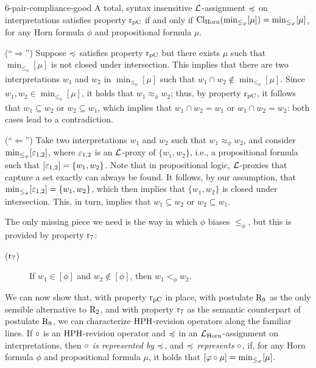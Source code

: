 \begin{prp}{}{6-pair-compliance-good}
	A total, syntax insensitive $\mathcal{L}$-assignment $\preccurlyeq$ on interpretations
	satisfies property $\mathrm{r}_{\mathrm{pC}}$
	if and only if
	${\operatorname{Cl}}_{\mathrm{Horn}}({\operatorname{min}}_{\le_{\varphi}}[\mu]) = {\operatorname{min}}_{\le_{\varphi}}[\mu]$,
	for any Horn formula $\phi$ and propositional formula $\mu$.
\end{prp}
\begin{prf*}{}{}%
	(``$\Rightarrow$'')
	Suppose
	$\preccurlyeq$ satisfies property $\mathrm{r}_{\mathrm{pC}}$
	but there exists $\mu$ such that 
	$\min_{\le_{\phi}}[\mu]$ is not closed under intersection.
	This implies that there are two interpretations $w_1$ and $w_2$ 
	in $\min_{\le_{\phi}}[\mu]$ such that $w_1\cap w_2\notin\min_{\le_{\phi}}[\mu]$.
	Since $w_1,w_2\in\min_{\le_{\phi}}[\mu]$,
	it holds that $w_1\approx_{\phi} w_2$;
	thus, by property $\mathrm{r}_{\mathrm{pC}}$, it follows that 
	$w_1\subseteq w_2$ or $w_2\subseteq w_1$,
	which implies that $w_1\cap w_2 = w_1$ or $w_1\cap w_2 = w_2$:
	both cases lead to a contradiction.

	(``$\Leftarrow$'')
	Take two interpretations $w_1$ and $w_2$ such that 
	$w_1\approx_{\phi} w_2$, and consider ${\operatorname{min}}_{\le_{\varphi}}[\varepsilon_{1,2}]$,
	where $\varepsilon_{1,2}$ is an $\mathcal{L}$-proxy of $\{w_1,w_2\}$,
	i.e., a propositional formula such that $[\varepsilon_{1,2}]=\{w_1,w_2\}$.
	Note that in propositional logic, $\mathcal{L}$-proxies that capture a set exactly 
	can always be found.
	It follows, by our assumption, 
	that ${\operatorname{min}}_{\le_{\varphi}}[\varepsilon_{1,2}]=\{w_1,w_2\}$,
	which then implies that $\{w_1,w_2\}$ is closed under intersection.
	This, in turn, implies that 
	$w_1\subseteq w_2$ or $w_2\subseteq w_1$.
\end{prf*}

The only missing piece we need is the way in which $\phi$
biases $\le_{\phi}$,
but this is provided by property $\mathrm{r}_{7}$:

\begin{description}
	\item[($\mathrm{r}_{7}$)] If $w_1\in[\phi]$ and $w_2\notin[\phi]$, then $w_1<_\phi w_2$.	
\end{description}

We can now show that, with property $\mathrm{r}_{\mathrm{pC}}$ in place, 
with postulate $\mathrm{R}_{9}$ as the only sensible alternative
to $\mathrm{R}_{2}$, 
and with property $\mathrm{r}_{7}$ as the semantic counterpart of
postulate $\mathrm{R}_{9}$, we can characterize ${\mathrm{HPH}}$-revision operators 
along the familiar lines.
If $\circ$ is an ${\mathrm{HPH}}$-revision operator
and $\preccurlyeq$ in an $\mathcal{L}_{\mathrm{Horn}}$-assignment on interpretations,
then \emph{$\circ$ is represented by $\preccurlyeq$},
and \emph{$\preccurlyeq$ represents $\circ$},
if, 
for any Horn formula $\phi$ and propositional formula 
$\mu$,
it holds that $[\varphi\circ\mu]={\operatorname{min}}_{\le_{\varphi}}[\mu]$.

